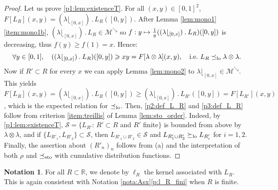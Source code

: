 \documentclass[10pt,a4paper]{article}
\providecommand{\ie}{i.e.\ }
\newcommand{\ldot}{\mathbin{.}}
\newcommand\mto{\mathchoice{\longmapsto}{\mapsto}{\mapsto}{\mapsto}}
\theoremstyle{plain}
\theoremstyle{definition}
\newtheorem{notation}[them]{Notation} %
\newcommand{\la}{\lambda}
\newcommand{\R}{\mathbb{R}}
\newcommand{\leqs}{\preceq_{\text{\rm sto}}}
\newcommand{\mdec}{\mathcal{M}^{\scriptscriptstyle\searrow}}
\newcommand{\leqlc}{\preceq_{\rm lo}}
\newcommand{\geqlc}{\succeq_{\rm lo}}
\begin{document}
\begin{proof} Let us prove \eqref{p1:lem:existenceT}. For all $(x,y)\in[0,1]^2$, $F[L_R](x,y)=(\la\lfloor_{[0,x]})\ldot L_R([0,y])$. After Lemma \ref{lem:mono1}\eqref{item:mono1b}, $(\la\lfloor_{[0,x]})\ldot L_R\in\mdec$ so $f:y\mto\frac1y((\la\lfloor_{[0,x]})\ldot L_R)([0,y])$ is decreasing, thus $f(y)\geq f(1)=x$. Hence:
\[
\forall y\in[0,1],\quad ((\la\lfloor_{[0,x]})\ldot L_R)([0,y])\geqslant xy=F[\la\otimes\la](x,y),\quad \text{\ie} L_R\leqlc \la\otimes\la.
\]
Now if $R'\subset R$ for every $x$ we can apply Lemma \ref{lem:mono2} to $\la\lfloor_{[0,x]}\in\mdec$. This yields $F[L_{R}](x,y)=(\la\lfloor_{[0,x]})\ldot L_{R}([0,y])\geqslant(\la\lfloor_{[0,x]})\ldot L_{R'}([0,y])=F[L_{R'}](x,y)$, which is the expected relation for $\leqlc$. Then, \eqref{p2:def_L_R} and \eqref{p3:def_L_R} follow from criterion \eqref{item:treillis} of Lemma \ref{lem:sto_order}. Indeed, by \eqref{p1:lem:existenceT}, $\mathcal{S}=\{L_{R'}:\,R'\subset R$ and $R'$ finite$\}$ is bounded from above by $\la\otimes\la$, and if $\{L_{R'_1},L_{R'_2}\}\subset\mathcal{S}$, then $L_{R'_1\cup R'_2}\in\mathcal{S}$ and $L_{R'_1\cup R'_2}\geqlc L_{R'_i}$ for $i=1,2$. Finally, the assertion about $(R'_n)_n$ follows from (a) and the interpretation of both $\rho$ and $\leqs$ with cumulative distribution functions.\end{proof}

\begin{notation}\label{nota:kernel_tS}For all $R\subset \R$, we denote by $\ell_R$ the kernel associated with $L_R$. This is again consistent with Notation \ref{nota:Asx}\eqref{p:l_R_fini} when $R$ is finite.
\end{notation}
\end{document}

